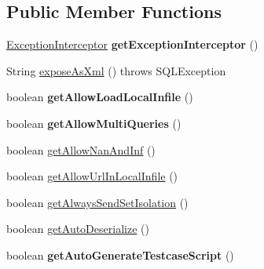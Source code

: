 \subsection*{Public Member Functions}
\begin{DoxyCompactItemize}
\item 
\mbox{\label{classcom_1_1mysql_1_1jdbc_1_1_connection_properties_impl_ad285cbbeee38f1ae9e07973b3adcba4c}} 
\mbox{\hyperlink{interfacecom_1_1mysql_1_1jdbc_1_1_exception_interceptor}{Exception\+Interceptor}} {\bfseries get\+Exception\+Interceptor} ()
\item 
String \mbox{\hyperlink{classcom_1_1mysql_1_1jdbc_1_1_connection_properties_impl_a1f5d852e50bec0d2947c724c9a33f8ee}{expose\+As\+Xml}} ()  throws S\+Q\+L\+Exception 
\item 
\mbox{\label{classcom_1_1mysql_1_1jdbc_1_1_connection_properties_impl_a82b5a043e535cbaf4eab8de6523caaff}} 
boolean {\bfseries get\+Allow\+Load\+Local\+Infile} ()
\item 
\mbox{\label{classcom_1_1mysql_1_1jdbc_1_1_connection_properties_impl_ac7820bd7204834b1e93940c2a38ddde8}} 
boolean {\bfseries get\+Allow\+Multi\+Queries} ()
\item 
boolean \mbox{\hyperlink{classcom_1_1mysql_1_1jdbc_1_1_connection_properties_impl_a7a2372abfe7156f94be2443ea7d4f29e}{get\+Allow\+Nan\+And\+Inf}} ()
\item 
boolean \mbox{\hyperlink{classcom_1_1mysql_1_1jdbc_1_1_connection_properties_impl_ac1a9cc94289786bd8b327902faf33d73}{get\+Allow\+Url\+In\+Local\+Infile}} ()
\item 
boolean \mbox{\hyperlink{classcom_1_1mysql_1_1jdbc_1_1_connection_properties_impl_a38ee7b9e4456b9a7c58c9840a21403f6}{get\+Always\+Send\+Set\+Isolation}} ()
\item 
boolean \mbox{\hyperlink{classcom_1_1mysql_1_1jdbc_1_1_connection_properties_impl_a9ae6fe9a4c45a57da76d048b6fe39c34}{get\+Auto\+Deserialize}} ()
\item 
\mbox{\label{classcom_1_1mysql_1_1jdbc_1_1_connection_properties_impl_aa6e97e327b8518942831e00276cd69ba}} 
boolean {\bfseries get\+Auto\+Generate\+Testcase\+Script} ()

\end{DoxyCompactItemize}
